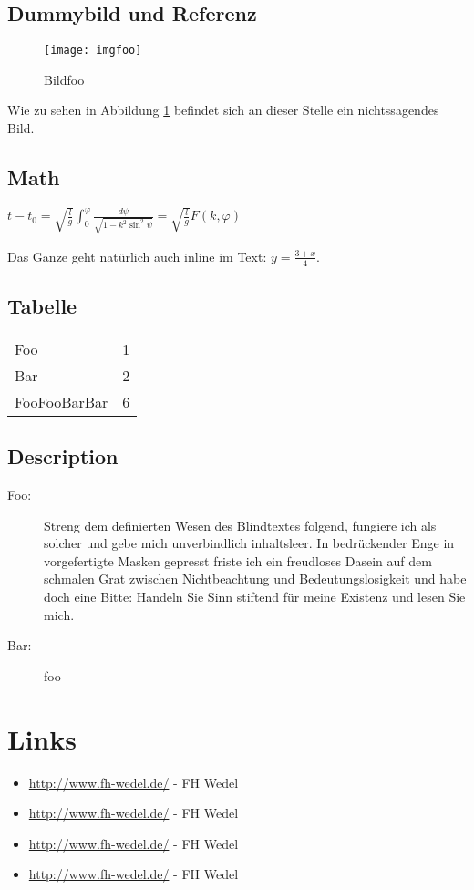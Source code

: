 \documentclass[a4paper,parskip=half,oneside]{scrbook}
\begin{document}
\section{Dummybild und Referenz}

  \begin{figure}[htbp]
    \centering
    \texttt{[image: imgfoo]}
    \caption{Bildfoo}
    \label{img:foo}
  \end{figure}

Wie zu sehen in Abbildung \ref{img:foo} befindet sich an dieser Stelle ein nichtssagendes Bild.

\section{Math}
\begin{math}
	t-t_{0}=\sqrt{\frac{l}{g}}\int_{0}^{\varphi}{\frac{d\psi}{\sqrt{1-k^{2}\sin^{2} {\psi}}}} = \sqrt{\frac{l}{g}} F(k,\varphi)
\end{math}

Das Ganze geht natürlich auch inline im Text: $y=\frac{3 + x}{4}$.

\section{Tabelle}
\begin{tabular}{l r}
Foo  & 1 \\
Bar & 2 \\
FooFooBarBar  & 6 \\
\end{tabular}

\section{Description}
  \begin{description}
    \item [Foo:]  Streng dem definierten Wesen des Blindtextes folgend, fungiere ich als solcher und gebe mich unverbindlich inhaltsleer. In bedrückender Enge in vorgefertigte Masken gepresst friste ich ein freudloses Dasein auf dem schmalen Grat zwischen Nichtbeachtung und Bedeutungslosigkeit und habe doch eine Bitte: Handeln Sie Sinn stiftend für meine Existenz und lesen Sie mich.
    \item [Bar:] foo
  \end{description}


\chapter{Links}

\begin{itemize}
  \item \url{http://www.fh-wedel.de/} - FH Wedel
  \item \url{http://www.fh-wedel.de/} - FH Wedel
  \item \url{http://www.fh-wedel.de/} - FH Wedel
  \item \url{http://www.fh-wedel.de/} - FH Wedel
\end{itemize}
\end{document}
